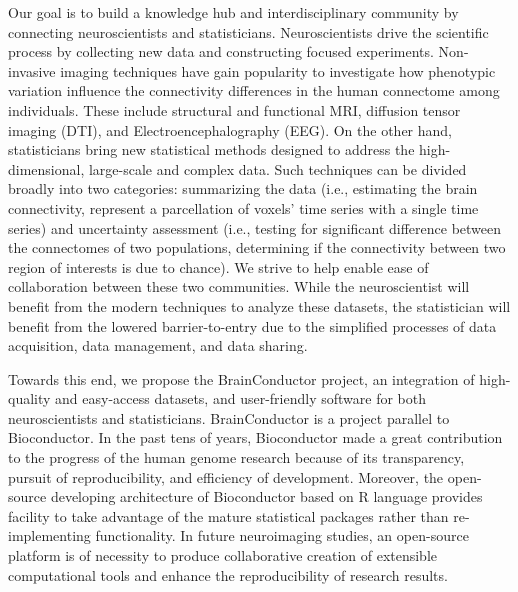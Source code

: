 \documentclass{nature}
\begin{document}
Our goal is to %
build a knowledge hub and interdisciplinary community by connecting
neuroscientists and statisticians.  Neuroscientists
drive the scientific process by collecting new data and constructing focused
experiments. Non-invasive imaging techniques have gain popularity to
investigate how phenotypic variation
influence the connectivity differences in the human
connectome among individuals\cite{sporns2005human,sporns2011human}. These
include structural and functional MRI,
diffusion tensor imaging (DTI), and Electroencephalography
(EEG).
On
the other hand, statisticians bring new statistical methods
designed to address the high-dimensional, large-scale and complex
data. Such techniques can be divided broadly into
two categories:
summarizing the data (i.e., estimating the brain connectivity, represent
a parcellation of voxels' time series with a single time series)
and uncertainty assessment (i.e., testing for significant difference
between the connectomes of two populations, determining if the
connectivity between two region of interests is due to chance).
We strive to help enable ease of collaboration between these two communities.
While the neuroscientist will benefit from the modern techniques to
analyze these datasets, the statistician
will benefit from the lowered barrier-to-entry
due to the  simplified processes of data acquisition, data management, and data
sharing.


Towards this end, we propose the BrainConductor project, an integration of
high-quality and easy-access datasets, and user-friendly software for both
neuroscientists and statisticians. BrainConductor is a project parallel to
Bioconductor. In the past tens of years,
Bioconductor\cite{gentleman2004bioconductor} made a great contribution to the
progress of
the human genome research because of its transparency, pursuit of
reproducibility, and efficiency of development. Moreover, the open-source
developing architecture of Bioconductor based on R language provides facility to
take advantage of the mature statistical packages rather than re-implementing
functionality. In future neuroimaging studies, an open-source platform is of
necessity to produce collaborative creation of extensible computational tools
and enhance the reproducibility of research results.
\end{document}
